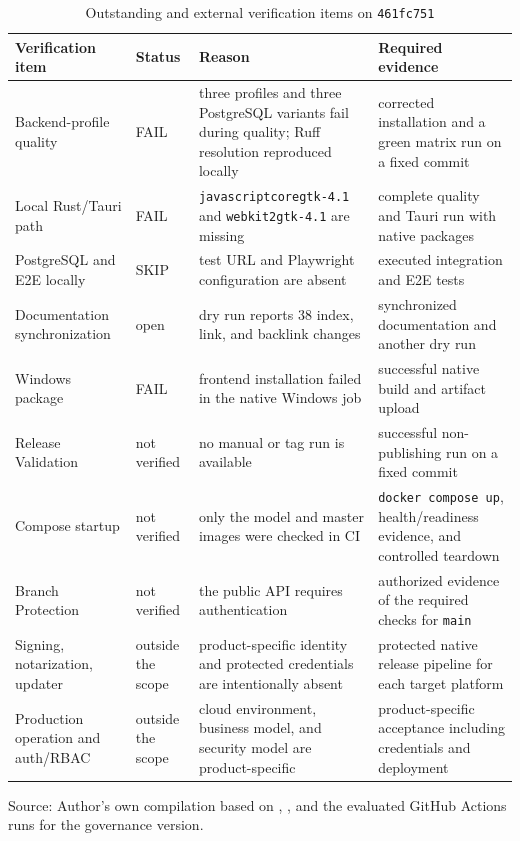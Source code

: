 \begin{table}[H]
  \centering
  \scriptsize
  \renewcommand{\arraystretch}{1.1}
  \caption{Outstanding and external verification items on \texttt{461fc751}}
  \label{tab:external-verification-items}
  \begin{tabularx}{\textwidth}{@{}>{\raggedright\arraybackslash}p{}>{\raggedright\arraybackslash}p{}>{\raggedright\arraybackslash}p{}>{\raggedright\arraybackslash}X@{}}
    \toprule
    \textbf{Verification item} & \textbf{Status} & \textbf{Reason} & \textbf{Required evidence} \\
    \midrule
    Backend-profile quality & FAIL & three profiles and three PostgreSQL variants fail during quality; Ruff resolution reproduced locally & corrected installation and a green matrix run on a fixed commit \\
    Local Rust/Tauri path & FAIL & \texttt{javascriptcoregtk-4.1} and \texttt{webkit2gtk-4.1} are missing & complete quality and Tauri run with native packages \\
    PostgreSQL and E2E locally & SKIP & test URL and Playwright configuration are absent & executed integration and E2E tests \\
    Documentation synchronization & open & dry run reports 38 index, link, and backlink changes & synchronized documentation and another dry run \\
    Windows package & FAIL & frontend installation failed in the native Windows job & successful native build and artifact upload \\
    Release Validation & not verified & no manual or tag run is available & successful non-publishing run on a fixed commit \\
    Compose startup & not verified & only the model and master images were checked in CI & \texttt{docker compose up}, health/readiness evidence, and controlled teardown \\
    Branch Protection & not verified & the public API requires authentication & authorized evidence of the required checks for \texttt{main} \\
    Signing, notarization, updater & outside the scope & product-specific identity and protected credentials are intentionally absent & protected native release pipeline for each target platform \\
    Production operation and auth/RBAC & outside the scope & cloud environment, business model, and security model are product-specific & product-specific acceptance including credentials and deployment \\
    \bottomrule
  \end{tabularx}
  \smallskip
  {\scriptsize Source: Author's own compilation based on
  \textcite{kleiveist2026acceptance,kleiveist2026release},
  \textcite{kleiveist2026quality-implementation}, and the evaluated GitHub
  Actions runs for the governance version.\par}
\end{table}
